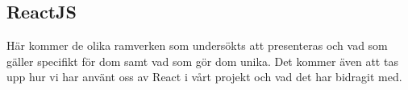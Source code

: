 \subsection{ReactJS}


Här kommer de olika ramverken som undersökts att presenteras och vad som gäller specifikt för dom samt vad som gör dom unika. Det kommer även att tas upp hur vi har använt oss av React i vårt projekt och vad det har bidragit med. 
